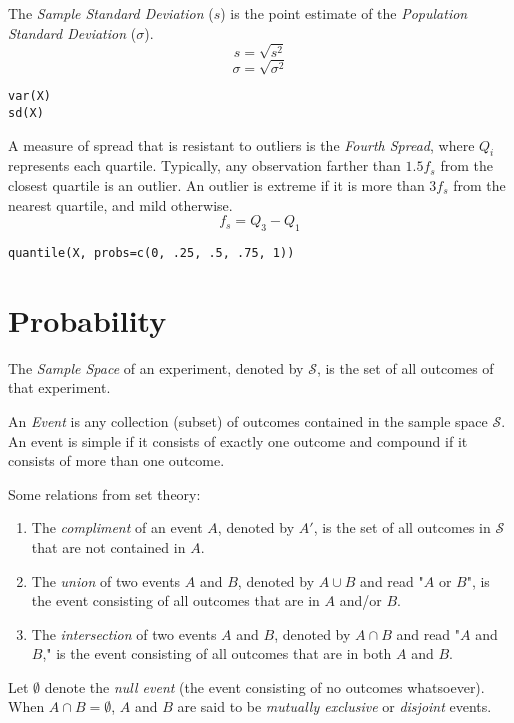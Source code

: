 \documentclass{article}
\begin{document}
The \textit{Sample Standard Deviation} ($s$) is the point estimate of the \textit{Population Standard Deviation} ($\sigma$).
$$ s = \sqrt{s^2} $$
$$ \sigma = \sqrt{\sigma^2} $$

\begin{lstlisting}
var(X)
sd(X)
\end{lstlisting}

A measure of spread that is resistant to outliers is the \textit{Fourth Spread}, where $Q_i$ represents each quartile. Typically, any observation farther than $1.5 f_s$ from the closest quartile is an outlier. An outlier is extreme if it is more than $3 f_s$ from the nearest quartile, and mild otherwise.
$$ f_s = Q_3 - Q_1 $$
\begin{lstlisting}
quantile(X, probs=c(0, .25, .5, .75, 1))
\end{lstlisting}

\section*{Probability}
The \textit{Sample Space} of an experiment, denoted by $\mathcal{S}$, is the set of all outcomes of that experiment.

An \textit{Event} is any collection (subset) of outcomes contained in the sample space $\mathcal{S}$. An event is simple if it consists of exactly one outcome and compound if it consists of more than one outcome.

\vspace{1em}
Some relations from set theory:
\begin{enumerate}
    \item The \textit{compliment} of an event $A$, denoted by $A'$, is the set of all outcomes in $\mathcal{S}$ that are not contained in $A$.
    \item The \textit{union} of two events $A$ and $B$, denoted by $A \cup B$ and read "$A$ or $B$", is the event consisting of all outcomes that are in $A$ and/or $B$.
    \item The \textit{intersection} of two events $A$ and $B$, denoted by $A \cap B$ and read "$A$ and $B$," is the event consisting of all outcomes that are in both $A$ and $B$.
\end{enumerate}

\vspace{1em}
Let $\emptyset$ denote the \textit{null event} (the event consisting of no outcomes whatsoever). When $A \cap B = \emptyset$, $A$ and $B$ are said to be \textit{mutually exclusive} or \textit{disjoint} events.
\end{document}
